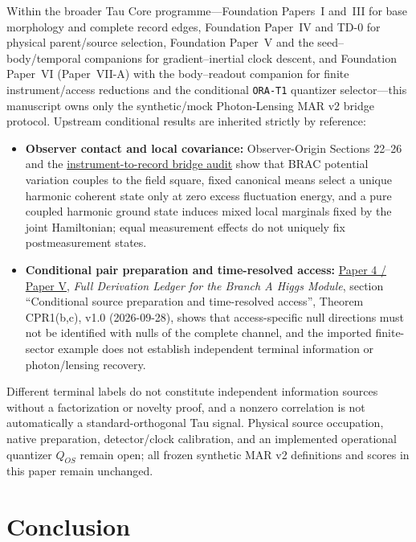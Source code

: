 \documentclass[12pt]{article}
\begin{document}
Within the broader Tau Core programme---Foundation Papers~I and~III for base
morphology and complete record edges, Foundation Paper~IV and TD-0 for physical
parent/source selection, Foundation Paper~V and the seed--body/temporal
companions for gradient--inertial clock descent, and Foundation Paper~VI
(Paper~VII-A) with the body--readout companion for finite instrument/access
reductions and the conditional \texttt{ORA-T1} quantizer selector---this
manuscript owns only the synthetic/mock Photon-Lensing MAR v2 bridge protocol.
Upstream conditional results are inherited strictly by reference:
\begin{itemize}[leftmargin=1.4em]
\item \textbf{Observer contact and local covariance:} Observer-Origin Sections
22--26 and the
\href{https://github.com/tau-core-research/tau-core-theory/blob/main/docs/tau_rqm_instrument_to_record_bridge_001.md}{instrument-to-record bridge audit}
show that BRAC potential variation couples to the field square, fixed canonical
means select a unique harmonic coherent state only at zero excess fluctuation
energy, and a pure coupled harmonic ground state induces mixed local marginals
fixed by the joint Hamiltonian; equal measurement effects do not uniquely fix
postmeasurement states.
\item \textbf{Conditional pair preparation and time-resolved access:}
\href{https://github.com/tau-core-research/tau-core-higgs-module-paper4/blob/main/paper4_full_derivation/full_derivation.pdf#nameddest=cpr1}{Paper 4 / Paper V},
\emph{Full Derivation Ledger for the Branch A Higgs Module}, section
``Conditional source preparation and time-resolved access'', Theorem CPR1(b,c),
v1.0 (2026-09-28), shows that access-specific null directions must not be
identified with nulls of the complete channel, and the imported finite-sector
example does not establish independent terminal information or photon/lensing
recovery.
\end{itemize}
Different terminal labels do not constitute independent information sources
without a factorization or novelty proof, and a nonzero correlation is not
automatically a standard-orthogonal Tau signal. Physical source occupation,
native preparation, detector/clock calibration, and an implemented operational
quantizer $Q_{OS}$ remain open; all frozen synthetic MAR v2 definitions and
scores in this paper remain unchanged.

\section{Conclusion}
\end{document}

